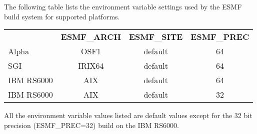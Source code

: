 

The following table lists the environment variable settings used by
the ESMF build system for supported platforms. \vspace{1ex}

\begin{tabular}{lccc}
  &{\bfseries ESMF\_ARCH}  & {\bfseries ESMF\_SITE } & {\bfseries ESMF\_PREC} \\

Alpha       &  OSF1    &  default &  64 \\
SGI         &  IRIX64  &  default &  64 \\
IBM RS6000  &  AIX     &  default &  64 \\
IBM RS6000  &  AIX     &  default &  32 

\end{tabular}

\vspace{1ex}

All the environment variable values listed are default values except
for the 32 bit precision (ESMF\_PREC=32) build on the IBM RS6000.  


